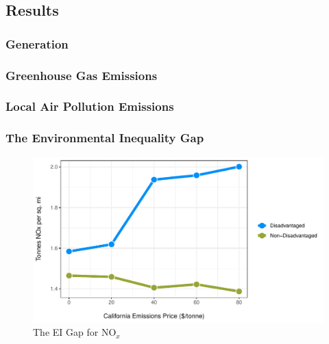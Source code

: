\subsection{Results}

\subsubsection*{Generation}



\subsubsection*{Greenhouse Gas Emissions}



\subsubsection*{Local Air Pollution Emissions}



\subsubsection*{The Environmental Inequality Gap}

\begin{figure}
    \centering
    \caption{The EI Gap for NO$_x$}
    \includegraphics[width=\textwidth]{figures/chapter5_figures/ei_gap_bca_nox.pdf}
\end{figure}

